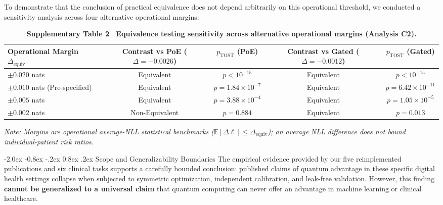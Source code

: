 \documentclass[10pt,a4paper]{article}
\makeatletter
\renewcommand{\subsection}{\@startsection{subsection}{2}{\z@}%
  {-2.0ex \@plus -0.8ex \@minus -.2ex}%
  {0.8ex \@plus.2ex}%
  {\normalfont\large\sffamily\bfseries\color{naturedark}}}
\makeatother
\begin{document}
To demonstrate that the conclusion of practical equivalence does not depend arbitrarily on this operational threshold, we conducted a sensitivity analysis across four alternative operational margins:

\begin{table}[h]
\centering
\small
\caption*{\textbf{\textsf{Supplementary Table 2 \textbar\ Equivalence testing sensitivity across alternative operational margins (Analysis C2).}}}
\begin{tabular}{lcccc}
\toprule
\textbf{Operational Margin $\Delta_{\text{equiv}}$} & \textbf{Contrast vs PoE ($\Delta = -0.0026$)} & \textbf{$p_{\text{TOST}}$ (PoE)} & \textbf{Contrast vs Gated ($\Delta = -0.0012$)} & \textbf{$p_{\text{TOST}}$ (Gated)} \\
\midrule
$\pm 0.020$ nats & Equivalent & $p < 10^{-15}$ & Equivalent & $p < 10^{-15}$ \\
$\pm 0.010$ nats (Pre-specified) & Equivalent & $p = 1.84 \times 10^{-7}$ & Equivalent & $p = 6.42 \times 10^{-11}$ \\
$\pm 0.005$ nats & Equivalent & $p = 3.88 \times 10^{-4}$ & Equivalent & $p = 1.05 \times 10^{-5}$ \\
$\pm 0.002$ nats & Non-Equivalent & $p = 0.884$ & Equivalent & $p = 0.013$ \\
\bottomrule
\end{tabular}
\vspace{2pt}
\begin{flushleft}
\footnotesize\textit{Note: Margins are operational average-NLL statistical benchmarks ($\mathbb{E}[\Delta\ell] \le \Delta_{\text{equiv}}$); an average NLL difference does not bound individual-patient risk ratios.}
\end{flushleft}
\end{table}

\subsection{Scope and Generalizability Boundaries}
The empirical evidence provided by our five reimplemented publications and six clinical tasks supports a carefully bounded conclusion: published claims of quantum advantage in these specific digital health settings collapse when subjected to symmetric optimization, independent calibration, and leak-free validation. However, this finding \textbf{cannot be generalized to a universal claim} that quantum computing can never offer an advantage in machine learning or clinical healthcare. 
\end{document}

